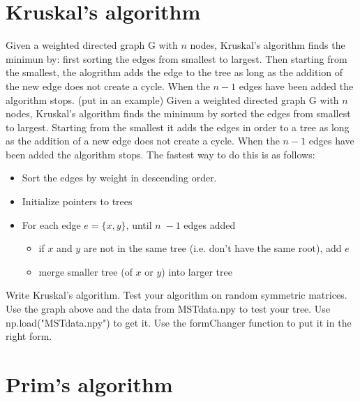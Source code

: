 \section*{Kruskal's algorithm}

Given a weighted directed graph G with $n$ nodes, Kruskal's algorithm finds the minimun by: first sorting the edges from smallest to largest.
Then starting from the smallest, the alogrithm adds the edge to the tree as long as the addition of the new edge does not create a cycle.
When the $n-1$ edges have been added the algorithm stops. (put in an example)
Given a weighted directed graph G with $n$ nodes, Kruskal's algorithm finds the minimum by sorted the edges from smallest to largest.
Starting from the smallest it adds the edges in order to a tree as long as the addition of a new edge does not create a cycle.
When the $n-1$ edges have been added the algorithm stops.
The fastest way to do this is as follows:
\flushleft
\begin{itemize}
\item Sort the edges by weight in descending order.
\item Initialize pointers to trees
\item For each edge $e=\{x, y\}$, until $n-1$ edges added  
\begin{itemize}
\item if $x$ and $y$ are not in the same tree (i.e. don’t have the same root), add $e$
\item merge smaller tree (of $x$ or $y$) into larger tree 
\end{itemize}
\end{itemize}

\begin{problem}
Write Kruskal's algorithm.
Test your algorithm on random symmetric matrices.
Use the graph above and the data from MSTdata.npy to test your tree.
Use np.load("MSTdata.npy") to get it.
Use the formChanger function to put it in the right form.
\end{problem}

\section*{Prim's algorithm}

